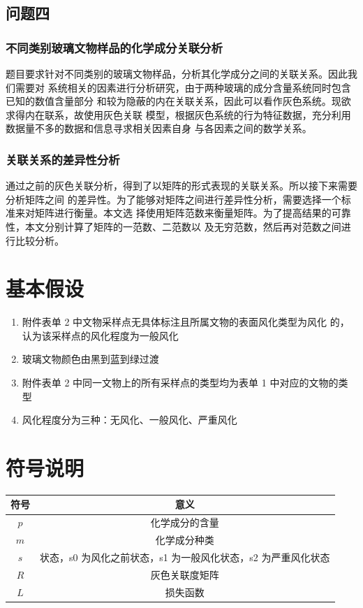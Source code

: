 \documentclass[withoutpreface,bwprint]{cumcmthesis} %
\begin{document}
\subsection{问题四}
\subsubsection{不同类别玻璃文物样品的化学成分关联分析}%
题目要求针对不同类别的玻璃文物样品，分析其化学成分之间的关联关系。因此我们需要对
系统相关的因素进行分析研究，由于两种玻璃的成分含量系统同时包含已知的数值含量部分
和较为隐蔽的内在关联关系，因此可以看作灰色系统。现欲求得内在联系，故使用灰色关联
模型，根据灰色系统的行为特征数据，充分利用数据量不多的数据和信息寻求相关因素自身
与各因素之间的数学关系。

\subsubsection{关联关系的差异性分析}%
通过之前的灰色关联分析，得到了以矩阵的形式表现的关联关系。所以接下来需要分析矩阵之间
的差异性。为了能够对矩阵之间进行差异性分析，需要选择一个标准来对矩阵进行衡量。本文选
择使用矩阵范数来衡量矩阵。为了提高结果的可靠性，本文分别计算了矩阵的一范数、二范数以
及无穷范数，然后再对范数之间进行比较分析。

\section{基本假设}
\begin{enumerate}
    \item 附件表单 2 中文物采样点无具体标注且所属文物的表面风化类型为风化
    的，认为该采样点的风化程度为一般风化
    \item 玻璃文物颜色由黑到蓝到绿过渡
    \item 附件表单 2 中同一文物上的所有采样点的类型均为表单 1 中对应的文物的类型
    \item 风化程度分为三种：无风化、一般风化、严重风化
\end{enumerate}
\section{符号说明}
{\centering
\begin{tabular}{|c|c|}
    \hline
    符号 & 意义 \\
    \hline
    $p$ & 化学成分的含量 \\
    \hline
    $m$ & 化学成分种类 \\
    \hline
    $s$ & 状态，s0 为风化之前状态，s1 为一般风化状态，s2 为严重风化状态 \\
    \hline
    $R$ & 灰色关联度矩阵 \\
    \hline
    $L$ & 损失函数 \\
    \hline
\end{tabular}}
\end{document}
